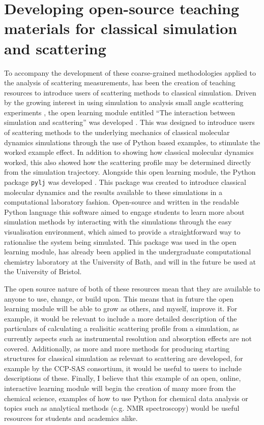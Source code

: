 \section{Developing open-source teaching materials for classical simulation and scattering}
To accompany the development of these coarse-grained methodologies applied to the analysis of scattering measurements, has been the creation of teaching resources to introduce users of scattering methods to classical simulation.
Driven by the growing interest in using simulation to analysis small angle scattering experiments \cite{hub_interpreting_2018,perkins_atomistic_2016}, the open learning module entitled ``The interaction between simulation and scattering'' was developed \cite{mccluskey_pythoninchemistry/sim_and_scat_2019}.
This was designed to introduce users of scattering methods to the underlying mechanics of classical molecular dynamics simulations through the use of Python based examples, to stimulate the worked example effect.
In addition to showing how classical molecular dynamics worked, this also showed how the scattering profile may be determined directly from the simulation trajectory.
Alongside this open learning module, the Python package \texttt{pylj} was developed \cite{mccluskey_pylj_2018,mccluskey_arm61/pylj_2019-2}.
This package was created to introduce classical molecular dynamics and the results available to these simulations in a computational laboratory fashion.
Open-source and written in the readable Python language this software aimed to engage students to learn more about simulation methods by interacting with the simulations through the easy visualisation environment, which aimed to provide a straightforward way to rationalise the system being simulated.
This package was used in the open learning module, has already been applied in the undergraduate computational chemistry laboratory at the University of Bath, and will in the future be used at the University of Bristol.

The open source nature of both of these resources mean that they are available to anyone to use, change, or build upon.
This means that in future the open learning module will be able to grow as others, and myself, improve it.
For example, it would be relevant to include a more detailed description of the particulars of calculating a realisitic scattering profile from a simulation, as currently aspects such as instrumental resolution and absorption effects are not covered.
Additionally, as more and more methods for producing starting structures for classical simulation as relevant to scattering are developed, for example by the CCP-SAS consortium, it would be useful to users to include descriptions of these.
Finally, I believe that this example of an open, online, interactive learning module will begin the creation of many more from the chemical science, examples of how to use Python for chemical data analysis or topics such as analytical methods (e.g. NMR spectroscopy) would be useful resources for students and academics alike.

